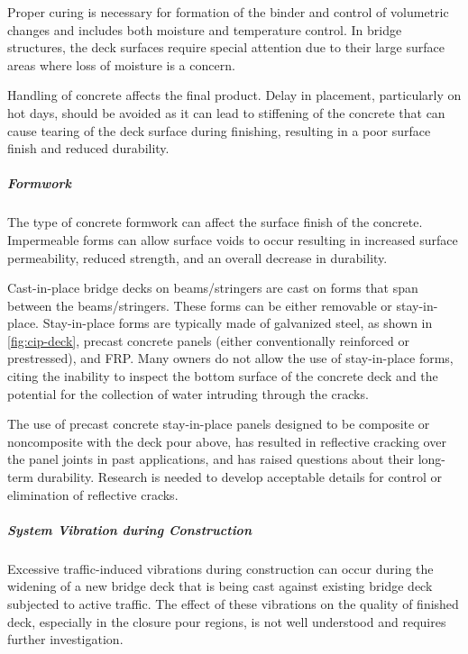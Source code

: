Proper curing is necessary for formation of the binder and control of volumetric changes and includes both
moisture and temperature control. In bridge structures, the deck surfaces require special attention due to their large
surface areas where loss of moisture is a concern.

Handling of concrete affects the final product. Delay in placement, particularly on hot days, should be avoided as
it can lead to stiffening of the concrete that can cause tearing of the deck surface during finishing, resulting in a poor
surface finish and reduced durability.

\subparagraph{Formwork}
The type of concrete formwork can affect the surface finish of the concrete. Impermeable forms can allow
surface voids to occur resulting in increased surface permeability, reduced strength, and an overall decrease in
durability.

Cast-in-place bridge decks on beams/stringers are cast on forms that span between the beams/stringers. These forms can be either removable or stay-in-place. Stay-in-place forms are typically made of galvanized steel, as shown in \cref{fig:cip-deck}, precast concrete panels (either conventionally reinforced or prestressed), and FRP. Many owners do not allow the use of stay-in-place forms, citing the inability to inspect the bottom surface of the concrete deck and the potential for the collection of water intruding through the cracks.

The use of precast concrete stay-in-place panels designed to be composite or noncomposite with the deck pour above, has resulted in reflective cracking over the panel joints in past applications, and has raised questions about their long-term durability. Research is needed to develop acceptable details for control or elimination of reflective cracks.

\subparagraph{System Vibration during Construction}
Excessive traffic-induced vibrations during construction can occur during the widening of a new bridge deck
that is being cast against existing bridge deck subjected to active traffic. The effect of these vibrations on the quality
of finished deck, especially in the closure pour regions, is not well understood and requires further investigation.


